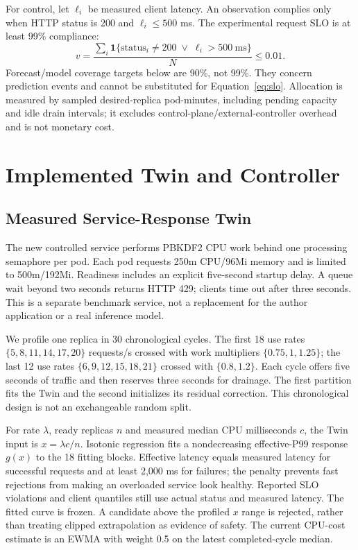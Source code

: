\documentclass[11pt,a4paper]{article}
\begin{document}
For control, let $\ell_i$ be measured client latency. An observation complies only when HTTP status is 200 and $\ell_i\leq500$ ms. The experimental request SLO is at least 99\% compliance:
\begin{equation}v=\frac{\sum_i\mathbf1\{\mathrm{status}_i\ne200\;\lor\;\ell_i>500\mathrm{\ ms}\}}{N}\leq0.01.\label{eq:slo}\end{equation}
Forecast/model coverage targets below are 90\%, not 99\%. They concern prediction events and cannot be substituted for Equation~\ref{eq:slo}. Allocation is measured by sampled desired-replica pod-minutes, including pending capacity and idle drain intervals; it excludes control-plane/external-controller overhead and is not monetary cost.

\section{Implemented Twin and Controller}
\subsection{Measured Service-Response Twin}
The new controlled service performs PBKDF2 CPU work behind one processing semaphore per pod. Each pod requests 250m CPU/96Mi memory and is limited to 500m/192Mi. Readiness includes an explicit five-second startup delay. A queue wait beyond two seconds returns HTTP 429; clients time out after three seconds. This is a separate benchmark service, not a replacement for the author application or a real inference model.

We profile one replica in 30 chronological cycles. The first 18 use rates $\{5,8,11,14,17,20\}$ requests/s crossed with work multipliers $\{0.75,1,1.25\}$; the last 12 use rates $\{6,9,12,15,18,21\}$ crossed with $\{0.8,1.2\}$. Each cycle offers five seconds of traffic and then reserves three seconds for drainage. The first partition fits the Twin and the second initializes its residual correction. This chronological design is not an exchangeable random split.

For rate $\lambda$, ready replicas $n$ and measured median CPU milliseconds $c$, the Twin input is $x=\lambda c/n$. Isotonic regression fits a nondecreasing effective-P99 response $g(x)$ to the 18 fitting blocks. Effective latency equals measured latency for successful requests and at least 2,000 ms for failures; the penalty prevents fast rejections from making an overloaded service look healthy. Reported SLO violations and client quantiles still use actual status and measured latency. The fitted curve is frozen. A candidate above the profiled $x$ range is rejected, rather than treating clipped extrapolation as evidence of safety. The current CPU-cost estimate is an EWMA with weight 0.5 on the latest completed-cycle median.
\end{document}

